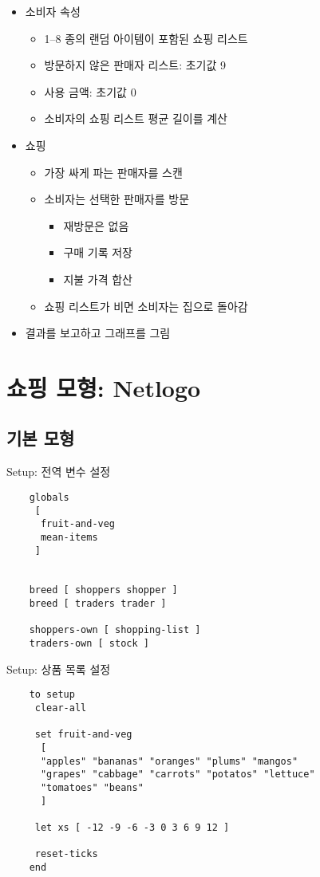 \documentclass[hyperref={unicode}]{beamer}
\begin{document}
\begin{frame}
\begin{itemize}
\item 소비자 속성
	\begin{itemize}
	\item 1--8 종의 랜덤 아이템이 포함된 쇼핑 리스트
	\item 방문하지 않은 판매자 리스트: 초기값 9
	\item 사용 금액: 초기값 0
	\item 소비자의 쇼핑 리스트 평균 길이를 계산
	\end{itemize}
\item 쇼핑
	\begin{itemize}
	\item 가장 싸게 파는 판매자를 스캔
	\item 소비자는 선택한 판매자를 방문
		\begin{itemize}
		\item 재방문은 없음
		\item 구매 기록 저장
		\item 지불 가격 합산
		\end{itemize}
	\item 쇼핑 리스트가 비면 소비자는 집으로 돌아감	
	\end{itemize}
\item 결과를 보고하고 그래프를 그림	
\end{itemize}	
\end{frame}

\section{쇼핑 모형: Netlogo}
\subsection{기본 모형}
\begin{frame}[fragile]{Setup: 전역 변수 설정}
\begin{verbatim}
	globals 
	 [
	  fruit-and-veg
	  mean-items
	 ]
	
	
	breed [ shoppers shopper ]	 
	breed [ traders trader ]
	 
	shoppers-own [ shopping-list ] 
	traders-own [ stock ]
\end{verbatim}
\end{frame}

\begin{frame}[fragile]{Setup: 상품 목록 설정}
\begin{verbatim}
	to setup
	 clear-all
	 
	 set fruit-and-veg
	  [
	  "apples" "bananas" "oranges" "plums" "mangos" 
	  "grapes" "cabbage" "carrots" "potatos" "lettuce" 
	  "tomatoes" "beans" 
	  ]
	  
	 let xs [ -12 -9 -6 -3 0 3 6 9 12 ]
	 
	 reset-ticks	  
	end	  
\end{verbatim}	
\end{frame}
\end{document}

